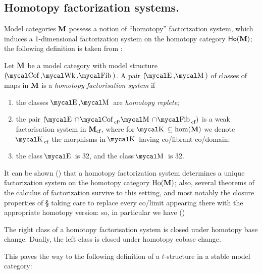 \subsection{Homotopy factorization systems.} 
Model categories $\textbf{M}$ possess a notion of ``homotopy'' factorization system, which induces a 1\hyp{}dimensional factorization system on the homotopy category $\mathsf{Ho}(\textbf{M})$; the following definition is taken from \cite[\adef \textbf{F.1.3}]{Joy}:
\begin{definition}\label{ho.fs}
Let $\textbf{M}$ be a model category with model structure $(\mcal{Cof},\mcal{Wk}, \mcal{Fib})$. A pair $(\EE,\MM)$ of classes of maps in $\textbf{M}$ is a \emph{homotopy factorisation system} if
\begin{enumerate}[label=(\smallcap{hfs}\oldstylenums{\arabic*})]
\item the classes $\EE,\MM$ are \emph{homotopy replete};
\item the pair $(\EE\cap\mcal{Cof}_\text{cf}, \MM\cap \mcal{Fib}_\text{cf})$ is a weak factorisation system in $\textbf{M}_\text{cf}$, where for $\mcal{K}\subseteq\hom(\cate{M})$ we denote $\mcal{K}_\text{cf}$ the morphisms in $\mcal{K}$ having co\fshyp{}fibrant co\fshyp{}domain;
\item the class $\EE$ is 32, and the class $\MM$ is 32.
\end{enumerate}
\end{definition}
It can be shown (\cite[\aprop \textbf{F.2.6}]{Joy}) that a homotopy factorization system determines a unique factorization system on the homotopy category $\text{Ho}(\textbf{M})$; also, several theorems of the calculus of factorization survive to this setting, and most notably the closure properties of \S{} taking care to replace every co\fshyp{}limit appearing there with the appropriate homotopy version: so, in particular we have (\cite[\aprop \textbf{F.4.8}]{Joy})
\begin{proposition}
The right class of a homotopy factorisation system is closed under
homotopy base change. Dually, the left class is closed under homotopy cobase
change.
\end{proposition}
This paves the way to the following definition of a $t$\hyp{}structure in a stable model category:
